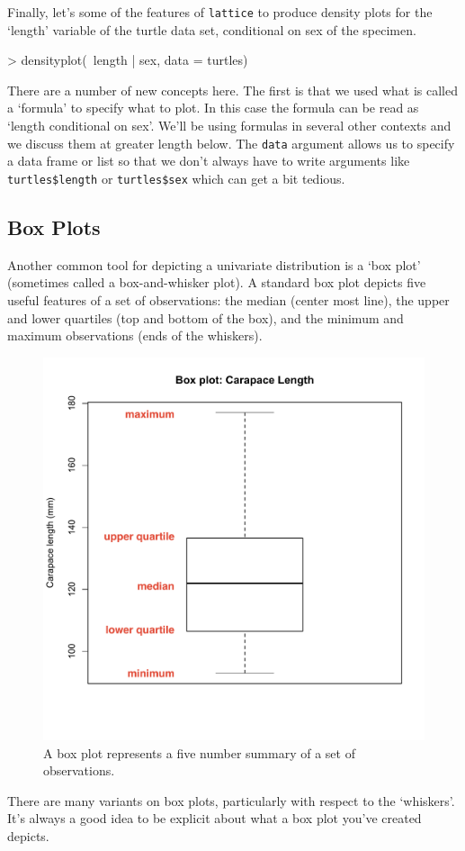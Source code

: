 Finally, let's some of the features of \lstinline!lattice! to produce
density plots for the `length' variable of the turtle data set,
conditional on sex of the specimen.

\begin{R}
> densityplot(~length | sex, data = turtles)
\end{R}
There are a number of new concepts here. The first is that we used what
is called a `formula' to specify what to plot. In this case the formula
can be read as `length conditional on sex'. We'll be using formulas in
several other contexts and we discuss them at greater length below. The
\lstinline!data! argument allows us to specify a data frame or list so
that we don't always have to write arguments like
\lstinline!turtles$length! or \lstinline!turtles$sex! which can get a
bit tedious.

\subsection{Box Plots}

Another common tool for depicting a univariate distribution is a `box
plot' (sometimes called a box-and-whisker plot). A standard box plot
depicts five useful features of a set of observations: the median
(center most line), the upper and lower quartiles (top and bottom of the
box), and the minimum and maximum observations (ends of the whiskers).

\begin{figure}[htbp]
\centering
\includegraphics[width=0.5\columnwidth]{./figures/hands-on2/boxplot-labeled.pdf}
\caption{A box plot represents a five number summary of a set of
observations.}
\end{figure}

There are many variants on box plots, particularly with respect to the
`whiskers'. It's always a good idea to be explicit about what a box plot
you've created depicts.

